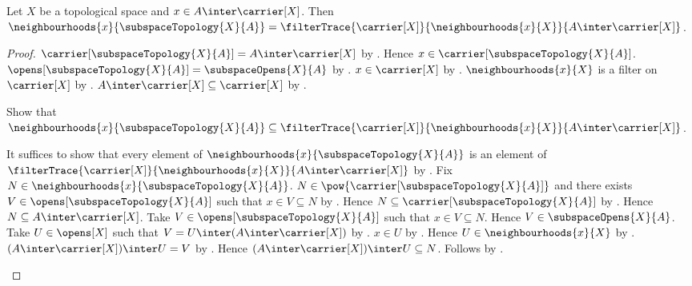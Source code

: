 \begin{theorem}\label{subspace_neighbourhood_filter_is_trace}
    Let $X$ be a topological space and
        $x\in A\inter\carrier[X]$.
    Then
        $\neighbourhoods{x}{\subspaceTopology{X}{A}}
            =\filterTrace{\carrier[X]}{\neighbourhoods{x}{X}}{
                A\inter\carrier[X]}$.
\end{theorem}
\begin{proof}
    $\carrier[\subspaceTopology{X}{A}]=A\inter\carrier[X]$ by
        .
    Hence $x\in\carrier[\subspaceTopology{X}{A}]$.
    $\opens[\subspaceTopology{X}{A}]=\subspaceOpens{X}{A}$ by
        .
    $x\in\carrier[X]$ by .
    $\neighbourhoods{x}{X}$ is a filter on $\carrier[X]$ by
        .
    $A\inter\carrier[X]\subseteq\carrier[X]$ by
        .

    Show that
        $\neighbourhoods{x}{\subspaceTopology{X}{A}}
            \subseteq\filterTrace{\carrier[X]}{\neighbourhoods{x}{X}}{
                A\inter\carrier[X]}$.
    \begin{subproof}
        It suffices to show that every element of
            $\neighbourhoods{x}{\subspaceTopology{X}{A}}$ is an element of
            $\filterTrace{\carrier[X]}{\neighbourhoods{x}{X}}{
                A\inter\carrier[X]}$ by .
        Fix $N\in\neighbourhoods{x}{\subspaceTopology{X}{A}}$.
        $N\in\pow{\carrier[\subspaceTopology{X}{A}]}$ and there exists
            $V\in\opens[\subspaceTopology{X}{A}]$ such that
            $x\in V\subseteq N$ by .
        Hence $N\subseteq\carrier[\subspaceTopology{X}{A}]$ by
            .
        Hence $N\subseteq A\inter\carrier[X]$.
        Take $V\in\opens[\subspaceTopology{X}{A}]$ such that
            $x\in V\subseteq N$.
        Hence $V\in\subspaceOpens{X}{A}$.
        Take $U\in\opens[X]$ such that
            $V=U\inter(A\inter\carrier[X])$ by
            .
        $x\in U$ by .
        Hence $U\in\neighbourhoods{x}{X}$ by
            .
        $(A\inter\carrier[X])\inter U=V$ by
            .
        Hence $(A\inter\carrier[X])\inter U\subseteq N$.
        Follows by .
    \end{subproof}


\end{proof}
